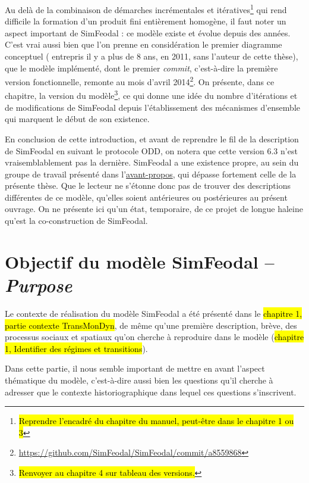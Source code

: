Au delà de la combinaison de démarches incrémentales et itératives\footnote{
\hl{Reprendre l'encadré du chapitre du manuel, peut-être dans le chapitre 1 ou 3}
} qui rend difficile la formation d'un produit fini entièrement homogène, il faut noter un aspect important de SimFeodal : ce modèle existe et évolue depuis des années.
C'est vrai aussi bien que l'on prenne en considération le premier diagramme conceptuel ( entrepris il y a plus de 8 ans, en 2011, sans l'auteur de cette thèse), que le modèle implémenté, dont le premier \textit{commit}, c'est-à-dire la première version fonctionnelle, remonte au mois d'avril 2014\footnote{
\href{https://github.com/SimFeodal/SimFeodal/commit/a85598682cda2350b08ea789b966e613dacb1b05}{https://github.com/SimFeodal/SimFeodal/commit/a8559868}}.
On présente, dans ce chapitre, la version \fg{} du modèle\footnote{
	\hl{Renvoyer au chapitre 4 sur tableau des versions.}
}, ce qui donne une idée du nombre d'itérations et de modifications de SimFeodal depuis l'établissement des mécanismes d'ensemble qui marquent le début de son existence.

En conclusion de cette introduction, et avant de reprendre le fil de la description de SimFeodal en suivant le protocole ODD, on notera que cette version 6.3 n'est vraisemblablement pas la dernière.
SimFeodal a une existence propre, au sein du groupe de travail présenté dans l'\hyperlink{avant-propos}{avant-propos}, qui dépasse fortement celle de la présente thèse.
Que le lecteur ne s'étonne donc pas de trouver des descriptions différentes de ce modèle, qu'elles soient antérieures ou postérieures au présent ouvrage.
On ne présente ici qu'un état, temporaire, de ce projet de longue haleine qu'est la co-construction de SimFeodal.


\let\orisectionmark\sectionmark
\renewcommand\sectionmark[1]{}%
\section[Objectifs du modèle SimFeodal -- \textit{Purpose}]{Objectif du modèle SimFeodal -- \large{\textit{Purpose}}}
\orisectionmark{Objectifs}
\let\sectionmark\orisectionmark

Le contexte de réalisation du modèle SimFeodal a été présenté dans le \hl{chapitre 1, partie contexte TransMonDyn}, de même qu'une première description, brève, des processus sociaux et spatiaux qu'on cherche à reproduire dans le modèle (\hl{chapitre 1, \og Identifier des régimes et transitions\fg{}}).

Dans cette partie, il nous semble important de mettre en avant l'aspect thématique du modèle, c'est-à-dire aussi bien les questions qu'il cherche à adresser que le contexte historiographique dans lequel ces questions s'inscrivent.

